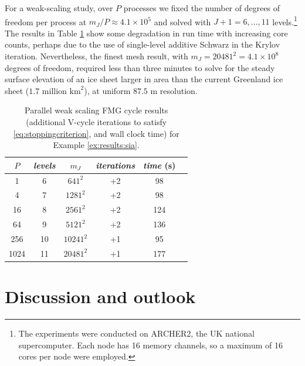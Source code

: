 \documentclass[review,hidelinks,onefignum,onetabnum,final]{siamart220329}  %
\begin{document}
\begin{example}
For a weak-scaling study, over $P$ processes we fixed the number of degrees of freedom per process at $m_J/P \approx 4.1 \times 10^5$ and solved with $J+1=6, \dots, 11$ levels.\footnote{The experiments were conducted on ARCHER2, the UK national supercomputer. Each node has 16 memory channels, so a maximum of 16 cores per node were employed.}  The results in Table \ref{tab:results:siaweak} show some degradation in run time with increasing core counts, perhaps due to the use of single-level additive Schwarz in the Krylov iteration.  Nevertheless, the finest mesh result, with $m_J=20481^2=4.1 \times 10^8$ degrees of freedom, required less than three minutes to solve for the steady surface elevation of an ice sheet larger in area than the current Greenland ice sheet ($1.7$ million $\text{km}^2$), at uniform $87.5$ m resolution.

\begin{table}[ht]
\centering
\begin{tabular}{c@{\hskip 4mm}c@{\hskip 4mm}c@{\hskip 7mm}c@{\hskip 4mm}cc}
\toprule
$P$ & \emph{levels} & $m_J$ & \emph{iterations} & \emph{time} (s) \\
\midrule
 1 & 6 & $641^2$ & +2 & 98 \\
 4 & 7 & $1281^2$ & +2 & 98 \\
 16 & 8 & $2561^2$ & +2 & 124 \\
 64 & 9 & $5121^2$ & +2 & 136 \\
 256 & 10 & $10241^2$ & +1 & 95 \\
 1024 & 11 & $20481^2$ & +1 & 177 \\
 \bottomrule
\end{tabular}
\bigskip
\caption{Parallel weak scaling FMG cycle results (additional V-cycle iterations to satisfy \eqref{eq:stoppingcriterion}, and wall clock time) for Example \ref{ex:results:sia}.}
\label{tab:results:siaweak}
\end{table}
\end{example}


\section{Discussion and outlook} \label{sec:discussion}
\end{document}
